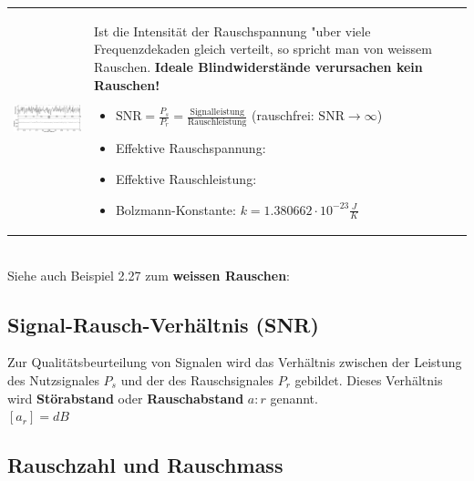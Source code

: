 		\begin{tabularx}{\textwidth}{lX}
			\parbox{8cm}{
				\includegraphics[width=8cm]{./bilder/rauschen2.png}
			} &
			\parbox{9.5cm}{
			Ist die Intensität der
			Rauschspannung "uber viele Frequenzdekaden
			gleich verteilt, so spricht man von weissem Rauschen.\\ \\
			\textbf{Ideale Blindwiderstände verursachen kein Rauschen!}
			\begin{itemize}
     			\item $\text{SNR} = \frac{P_s}{P_r} = \frac{\text{Signalleistung}}{\text{Rauschleistung}}$ (rauschfrei: $ \text{SNR} \rightarrow \infty$) 
     			\item Effektive Rauschspannung: 
     			\item Effektive Rauschleistung: 
     			\item Bolzmann-Konstante: $k =1.380662 \cdot 10^{-23}\frac{J}{K}$
   			\end{itemize}
			}
		\end{tabularx}\\
		
		Siehe auch Beispiel 2.27 zum \textbf{weissen Rauschen}: 
		
	\subsection{Signal-Rausch-Verhältnis (SNR) }
	
		Zur Qualitätsbeurteilung von Signalen wird das Verhältnis zwischen der Leistung des Nutzsignales $P_s$ und der 
		des Rauschsignales $P_r$ gebildet. Dieses Verhältnis wird \textbf{Störabstand} oder \textbf{Rauschabstand} $a:r$ genannt.\\
	
		$[a_r] = dB$
	
	
	\subsection{Rauschzahl und Rauschmass }
	
